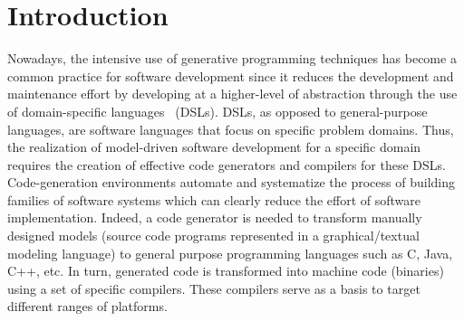 \section{Introduction}
Nowadays, the intensive use of generative programming techniques has become a common practice for software development since it reduces the development and maintenance effort by developing at a higher-level of abstraction through the use of domain-specific languages~\cite{brambilla2012model} (DSLs). 
DSLs, as opposed to general-purpose languages, are software languages that focus on specific problem domains. Thus, the realization of model-driven software development for a specific domain requires the creation of effective code generators and compilers for these DSLs.
Code-generation environments automate and systematize the process of building families of software systems which can clearly reduce the effort of software implementation.
Indeed, a code generator is needed to transform manually designed models (source code programs represented in a graphical/textual modeling language) to general purpose programming languages such as C, Java, C++, etc. In turn, generated code is transformed into machine code (binaries) using a set of specific compilers.
These compilers serve as a basis to target different ranges of platforms. 

